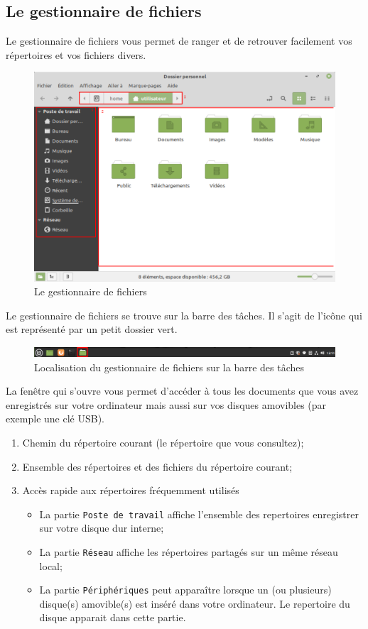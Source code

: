 \documentclass[12pt]{book}
\begin{document}
	\subsection{Le gestionnaire de fichiers}\label{sec:fichiers}
		Le gestionnaire de fichiers vous permet de ranger et de retrouver facilement vos répertoires et vos fichiers divers.
		\begin{figure}[h]
			\centering
			\includegraphics[width=.95\textwidth]{include/fichiers.png}
			\caption{Le gestionnaire de fichiers}
			\label{fig:fichiers}
		\end{figure}\par
		Le gestionnaire de fichiers se trouve sur la barre des tâches.
		Il s'agit de l'icône qui est représenté par un petit dossier vert.
		\begin{figure}[h]
			\centering
			\includegraphics[width=\textwidth]{include/fichier_barre.png}
			\caption{Localisation du gestionnaire de fichiers sur la barre des tâches}
			\label{fig:fichiers_barre}
		\end{figure}\par
		La fenêtre qui s'ouvre vous permet d'accéder à tous les documents que vous avez enregistrés sur votre ordinateur mais aussi sur vos disques amovibles (par exemple une clé USB).
		\begin{enumerate}
			\item Chemin du répertoire courant (le répertoire que vous consultez);
			\item Ensemble des répertoires et des fichiers du répertoire courant;
			\item Accès rapide aux répertoires fréquemment utilisés
			\begin{itemize}
				\item La partie \texttt{Poste de travail} affiche l'ensemble des repertoires enregistrer sur votre disque dur interne;
				\item La partie \texttt{Réseau} affiche les répertoires partagés sur un même réseau local;
				\item La partie \texttt{Périphériques} peut apparaître lorsque un (ou plusieurs) disque(s) amovible(s) est inséré dans votre ordinateur. Le repertoire du disque apparait dans cette partie.
			\end{itemize}
		\end{enumerate}
\end{document}
